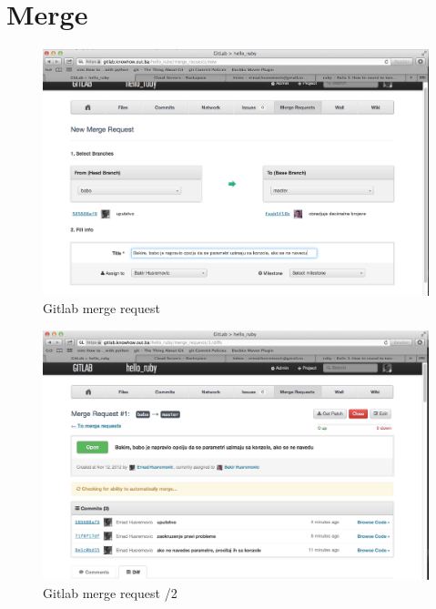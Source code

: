 \documentclass[times, utf8, seminar]{fit}
\begin{document}
\section{Merge}

\begin{figure}[H]
\centering
\includegraphics[width=15cm]{img/gitlab_merge_request.png}
\caption{Gitlab merge request}
\end{figure}


\begin{figure}[H]
\centering
\includegraphics[width=15cm]{img/gitlab_merge_request_2.png}
\caption{Gitlab merge request /2}
\end{figure}
\end{document}
